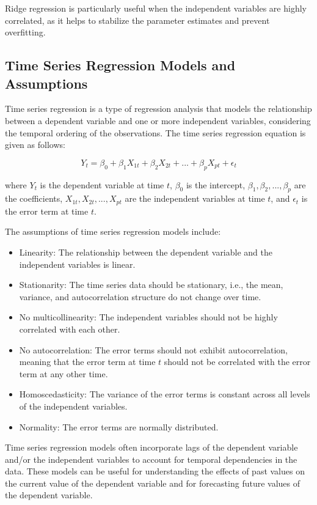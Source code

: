 \documentclass{beamer}
\begin{document}
Ridge regression is particularly useful when the independent variables are highly correlated, as it helps to stabilize the parameter estimates and prevent overfitting.

\subsection{Time Series Regression Models and Assumptions}
Time series regression is a type of regression analysis that models the relationship between a dependent variable and one or more independent variables, considering the temporal ordering of the observations. The time series regression equation is given as follows:

\begin{equation}
Y_t = \beta_0 + \beta_1X_{1t} + \beta_2X_{2t} + ... + \beta_pX_{pt} + \epsilon_t
\end{equation}

where $Y_t$ is the dependent variable at time $t$, $\beta_0$ is the intercept, $\beta_1, \beta_2, ..., \beta_p$ are the coefficients, $X_{1t}, X_{2t}, ..., X_{pt}$ are the independent variables at time $t$, and $\epsilon_t$ is the error term at time $t$.

The assumptions of time series regression models include:

\begin{itemize}
\item Linearity: The relationship between the dependent variable and the independent variables is linear.
\item Stationarity: The time series data should be stationary, i.e., the mean, variance, and autocorrelation structure do not change over time.
\item No multicollinearity: The independent variables should not be highly correlated with each other.
\item No autocorrelation: The error terms should not exhibit autocorrelation, meaning that the error term at time $t$ should not be correlated with the error term at any other time.
\item Homoscedasticity: The variance of the error terms is constant across all levels of the independent variables.
\item Normality: The error terms are normally distributed.
\end{itemize}

Time series regression models often incorporate lags of the dependent variable and/or the independent variables to account for temporal dependencies in the data. These models can be useful for understanding the effects of past values on the current value of the dependent variable and for forecasting future values of the dependent variable.
\end{document}
